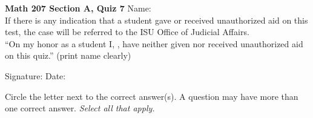 \documentclass[12pt]{article}
\begin{document}
\vskip-2cm

\noindent \textbf{Math 207 Section A, Quiz 7} \hfill
Name: \underline{\phantom{XXXXXXXXXXXXXX}}\\[8pt]
  If there is any indication that a
student gave or received unauthorized aid on this test, the case 
will be referred to the ISU Office of Judicial Affairs.\\[16pt]
``On my honor as a student I,
\underline{\phantom{XXXXXXXXXXXXXXXXXXXXX}}, have neither
given nor received unauthorized aid on this quiz.''
\hbox{} \hskip 1cm {\small (print name clearly)}\\[4pt]
\begin{flushright} Signature: \underline{\phantom{XXXXXXXXXXXXXXXXXXXXXXXX}}
  Date: \underline{\phantom{XXXXXXXXXX}}
\end{flushright}
\vskip5mm
 Circle the letter next to the correct answer(s).
A question may have more than one correct answer.
\emph{Select all that apply.}
\end{document}
